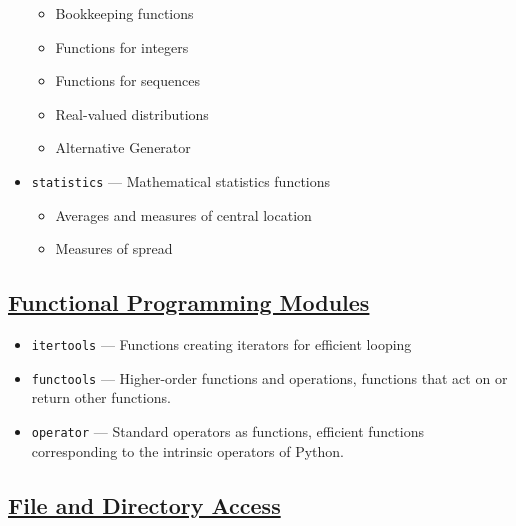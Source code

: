 \documentclass[]{book}
\providecommand{\tightlist}{%
  \setlength{\itemsep}{0pt}\setlength{\parskip}{0pt}}
\theoremstyle{definition}
\theoremstyle{definition}
\theoremstyle{definition}
\theoremstyle{remark}
\begin{document}
\begin{itemize}
  \begin{itemize}
  \tightlist
  \item
    Bookkeeping functions
  \item
    Functions for integers
  \item
    Functions for sequences
  \item
    Real-valued distributions
  \item
    Alternative Generator
  \end{itemize}
\item
  \texttt{statistics} --- Mathematical statistics functions

  \begin{itemize}
  \tightlist
  \item
    Averages and measures of central location
  \item
    Measures of spread
  \end{itemize}
\end{itemize}

\subsection{\texorpdfstring{\href{https://docs.python.org/3.7/library/functional.html}{Functional
Programming
Modules}}{Functional Programming Modules}}\label{functional-programming-modules}

\begin{itemize}
\tightlist
\item
  \texttt{itertools} --- Functions creating iterators for efficient
  looping
\item
  \texttt{functools} --- Higher-order functions and operations,
  functions that act on or return other functions.
\item
  \texttt{operator} --- Standard operators as functions, efficient
  functions corresponding to the intrinsic operators of Python.
\end{itemize}

\subsection{\texorpdfstring{\href{https://docs.python.org/3.7/library/filesys.html}{File
and Directory
Access}}{File and Directory Access}}\label{file-and-directory-access}
\end{document}
